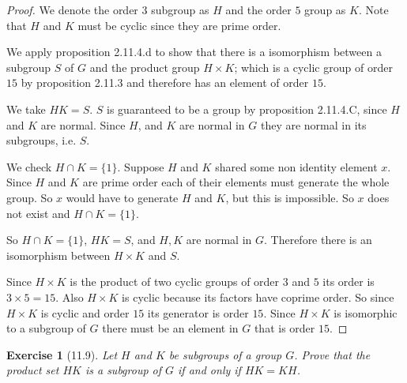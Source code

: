 \documentclass[12pt]{article}
\newtheorem*{exer}{Exercise}
\begin{document}
\begin{proof}

    We denote the order $3$ subgroup as $H$ and the order $5$ group as
    $K$. Note that $H$ and $K$ must be cyclic since they are prime
    order.

    We apply proposition 2.11.4.d to show that there is a isomorphism
    between a subgroup $S$ of $G$ and the product group $H \times K$;
    which is a cyclic group of order $15$ by proposition 2.11.3 and
    therefore has an element of order $15$.

    We take $HK = S$. $S$ is guaranteed to be a group by proposition
    2.11.4.C, since $H$ and $K$ are normal. Since $H$, and $K$ are
    normal in $G$ they are normal in its subgroups, i.e. $S$.

    We check $H \cap K = \{1\}$. Suppose $H$ and $K$ shared some
    non identity element $x$. Since $H$ and $K$ are prime order each of
    their elements must generate the whole group. So $x$ would have to
    generate $H$ and $K$, but this is impossible. So $x$ does not exist
    and $H \cap K = \{1\}$.

    So $H \cap K = \{1\}$, $HK = S$, and $H, K$ are normal in
    $G$. Therefore there is an isomorphism between $H \times K$ and $S$.

    Since $H \times K$ is the product of two cyclic groups of order $3$
    and $5$ its order is $3 \times 5 = 15$. Also $H \times K$ is cyclic
    because its factors have coprime order. So since $H \times K$ is
    cyclic and order $15$ its generator is order $15$. Since $H \times
    K$ is isomorphic to a subgroup of $G$ there must be an element in
    $G$ that is order $15$.

\end{proof}


\begin{exer}[11.9]
Let $H$ and $K$ be subgroups of a group $G$. Prove that the product set
$HK$ is a subgroup of $G$ if and only if $HK=KH$.
\end{exer}
\end{document}
